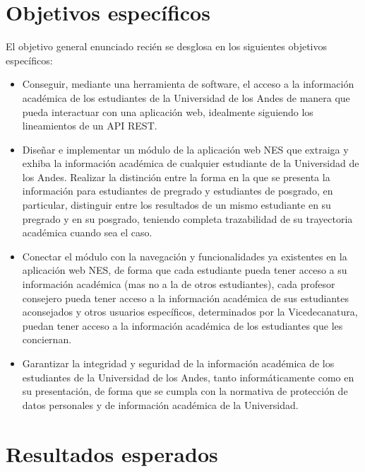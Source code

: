 \documentclass{fmb-proposal}
\begin{document}
\section{Objetivos específicos}

El objetivo general enunciado recién se desglosa en los siguientes objetivos específicos:
\begin{itemize}
	\item Conseguir, mediante una herramienta de software, el acceso a la información académica de los estudiantes de la Universidad de los Andes de manera que pueda interactuar con una aplicación web, idealmente siguiendo los lineamientos de un API REST.
	\item Diseñar e implementar un módulo de la aplicación web NES que extraiga y exhiba la información académica de cualquier estudiante de la Universidad de los Andes. Realizar la distinción entre la forma en la que se presenta la información para estudiantes de pregrado y estudiantes de posgrado, en particular, distinguir entre los resultados de un mismo estudiante en su pregrado y en su posgrado, teniendo completa trazabilidad de su trayectoria académica cuando sea el caso.
	\item Conectar el módulo con la navegación y funcionalidades ya existentes en la aplicación web NES, de forma que cada estudiante pueda tener acceso a su información académica (mas no a la de otros estudiantes), cada profesor consejero pueda tener acceso a la información académica de sus estudiantes aconsejados y otros usuarios específicos, determinados por la Vicedecanatura, puedan tener acceso a la información académica de los estudiantes que les conciernan.
	\item Garantizar la integridad y seguridad de la información académica de los estudiantes de la Universidad de los Andes, tanto informáticamente como en su presentación, de forma que se cumpla con la normativa de protección de datos personales y de información académica de la Universidad.
\end{itemize}

\section{Resultados esperados}
\end{document}
